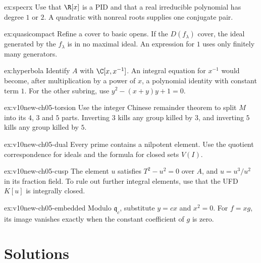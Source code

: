 \begin{hint}{ex:specrx}
Use that $\R[x]$ is a PID and that a real irreducible polynomial has degree $1$ or $2$. A quadratic with nonreal roots supplies one conjugate pair.
\end{hint}

\begin{hint}{ex:quasicompact}
Refine a cover to basic opens. If the $D(f_\lambda)$ cover, the ideal generated by the $f_\lambda$ is in no maximal ideal. An expression for $1$ uses only finitely many generators.
\end{hint}

\begin{hint}{ex:hyperbola}
Identify $A$ with $\C[x,x^{-1}]$. An integral equation for $x^{-1}$ would become, after multiplication by a power of $x$, a polynomial identity with constant term $1$. For the other subring, use $y^2-(x+y)y+1=0$.
\end{hint}

\begin{hint}{ex:v10new-ch05-torsion}
Use the integer Chinese remainder theorem to split $M$ into its $4$, $3$ and $5$ parts. Inverting $3$ kills any group killed by $3$, and inverting $5$ kills any group killed by $5$.
\end{hint}

\begin{hint}{ex:v10new-ch05-dual}
Every prime contains a nilpotent element. Use the quotient correspondence for ideals and the formula for closed sets $V(I)$.
\end{hint}

\begin{hint}{ex:v10new-ch05-cusp}
The element $u$ satisfies $T^2-u^2=0$ over $A$, and $u=u^3/u^2$ in its fraction field. To rule out further integral elements, use that the UFD $K[u]$ is integrally closed.
\end{hint}

\begin{hint}{ex:v10new-ch05-embedded}
Modulo $\mathfrak q_c$, substitute $y=cx$ and $x^2=0$. For $f=xg$, its image vanishes exactly when the constant coefficient of $g$ is zero.
\end{hint}

\section{Solutions}

